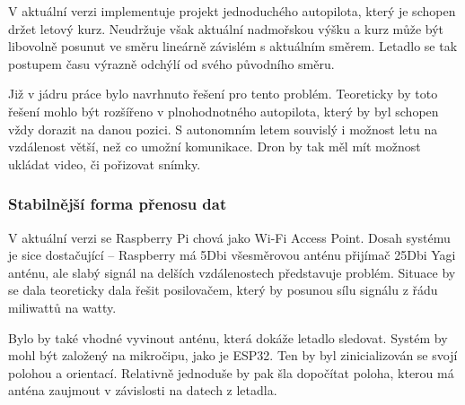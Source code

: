 \documentclass[a4paper,oneside,12pt]{report}
\let\openright=\clearpage
\begin{document}
V aktuální verzi implementuje projekt jednoduchého autopilota, který je schopen držet letový kurz.
Neudržuje však aktuální nadmořskou výšku a kurz může být libovolně posunut ve směru lineárně závislém s aktuálním směrem.
Letadlo se tak postupem času výrazně odchýlí od svého původního směru.

Již v jádru práce bylo navrhnuto řešení pro tento problém.
Teoreticky by toto řešení mohlo být rozšířeno v plnohodnotného autopilota, který by byl schopen vždy dorazit na danou pozici.
S autonomním letem souvislý i možnost letu na vzdálenost větší, než co umožní komunikace.
Dron by tak měl mít možnost ukládat video, či pořizovat snímky.

\subsection{Stabilnější forma přenosu dat}

V aktuální verzi se Raspberry Pi chová jako Wi-Fi Access Point.
Dosah systému je sice dostačující -- Raspberry má 5Dbi všesměrovou anténu přijímač 25Dbi Yagi anténu, ale slabý signál na delších vzdálenostech představuje problém.
Situace by se dala teoreticky dala řešit posilovačem, který by posunou sílu signálu z řádu miliwattů na watty.

Bylo by také vhodné vyvinout anténu, která dokáže letadlo sledovat.
Systém by mohl být založený na mikročipu, jako je ESP32.
Ten by byl zinicializován se svojí polohou a orientací.
Relativně jednoduše by pak šla dopočítat poloha, kterou má anténa zaujmout v závislosti na datech z letadla.

\chapter*{}
\setcounter{page}{5} %





\listoffigures
\openright
\end{document}
